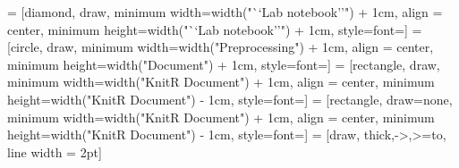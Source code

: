 \documentclass[landscape]{article}
\begin{document}
\pagestyle{empty}




 = [diamond, draw,
    minimum width={width("``Lab notebook''") + 1cm},
    align = center, 
    minimum height={width("``Lab notebook''") + 1cm},
    style={font=\Large{}\selectfont}]
 = [circle, draw, 
    minimum width={width("Preprocessing") + 1cm},
    align = center, 
    minimum height={width("Document") + 1cm},
    style={font=\Large{}\selectfont}]
 = [rectangle, draw,
    minimum width={width("KnitR Document") + 1cm},
    align = center, 
    minimum height={width("KnitR Document") - 1cm},
    style={font=\Large{}\selectfont}]
 = [rectangle, draw=none,
    minimum width={width("KnitR Document") + 1cm},
    align = center, 
    minimum height={width("KnitR Document") - 1cm},
    style={font=\Large{}\selectfont}]
 = [draw, thick,->,>=to, line width = 2pt]

\end{document}
